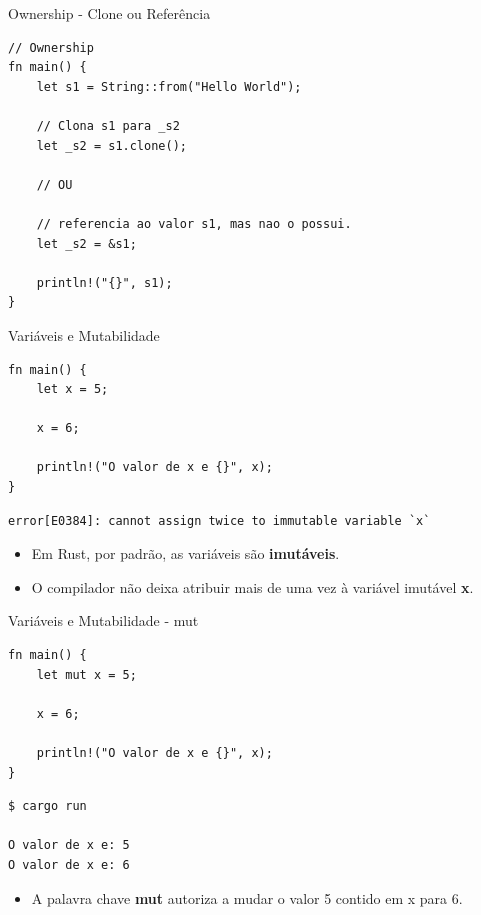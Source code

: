 \begin{frame}[fragile]{Ownership - Clone ou Referência}
\lstset{language=Rust, style=boxed}
\begin{lstlisting}
// Ownership
fn main() {
    let s1 = String::from("Hello World");

    // Clona s1 para _s2
    let _s2 = s1.clone();
    
    // OU
    
    // referencia ao valor s1, mas nao o possui.
    let _s2 = &s1; 

    println!("{}", s1);
}
\end{lstlisting}
\end{frame}

\begin{frame}[fragile]{Variáveis e Mutabilidade}
\lstset{language=Rust, style=boxed}
\begin{lstlisting}
fn main() {
    let x = 5;
    
    x = 6;

    println!("O valor de x e {}", x);
}
\end{lstlisting}
\begin{lstlisting}
error[E0384]: cannot assign twice to immutable variable `x`
\end{lstlisting}
\begin{itemize}
    \item Em Rust, por padrão, as variáveis são \textbf{imutáveis}.
    \item O compilador não deixa atribuir mais de uma vez à variável imutável \textbf{x}.
\end{itemize}
\end{frame}

\begin{frame}[fragile]{Variáveis e Mutabilidade - mut}
\lstset{language=Rust, style=boxed}
\begin{lstlisting}
fn main() {
    let mut x = 5;
    
    x = 6;

    println!("O valor de x e {}", x);
}
\end{lstlisting}

\begin{lstlisting}
$ cargo run

O valor de x e: 5
O valor de x e: 6
\end{lstlisting}
\begin{itemize}
    \item A palavra chave \textbf{mut} autoriza a mudar o valor 5 contido em x para 6.
\end{itemize}{}
\end{frame}

